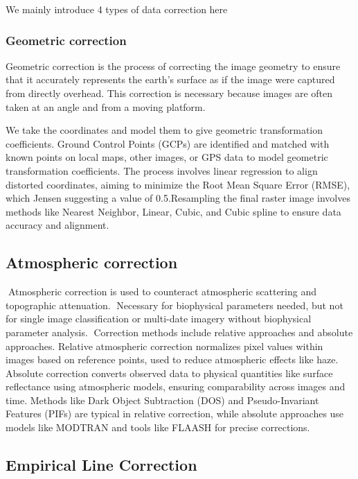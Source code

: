 \documentclass[
  letterpaper,
  DIV=11,
  numbers=noendperiod]{scrreprt}
\begin{document}
We mainly introduce 4 types of data correction here

\subsubsection{Geometric correction}\label{geometric-correction}

Geometric correction is the process of correcting the image geometry to
ensure that it accurately represents the earth's surface as if the image
were captured from directly overhead. This correction is necessary
because images are often taken at an angle and from a moving platform.

We take the coordinates and model them to give geometric transformation
coefficients. Ground Control Points (GCPs) are identified and matched
with known points on local maps, other images, or GPS data to model
geometric transformation coefficients. The process involves linear
regression to align distorted coordinates, aiming to minimize the Root
Mean Square Error (RMSE), which Jensen suggesting a value of
0.5.Resampling the final raster image involves methods like Nearest
Neighbor, Linear, Cubic, and Cubic spline to ensure data accuracy and
alignment.

\subsection{Atmospheric correction}\label{atmospheric-correction}

Atmospheric correction is used to counteract atmospheric scattering and
topographic attenuation. Necessary for biophysical parameters needed,
but not for single image classification or multi-date imagery without
biophysical parameter analysis. Correction methods include relative
approaches and absolute approaches. Relative atmospheric correction
normalizes pixel values within images based on reference points, used to
reduce atmospheric effects like haze. Absolute correction converts
observed data to physical quantities like surface reflectance using
atmospheric models, ensuring comparability across images and time.
Methods like Dark Object Subtraction (DOS) and Pseudo-Invariant Features
(PIFs) are typical in relative correction, while absolute approaches use
models like MODTRAN and tools like FLAASH for precise corrections.

\subsection{Empirical Line Correction}\label{empirical-line-correction}
\end{document}
